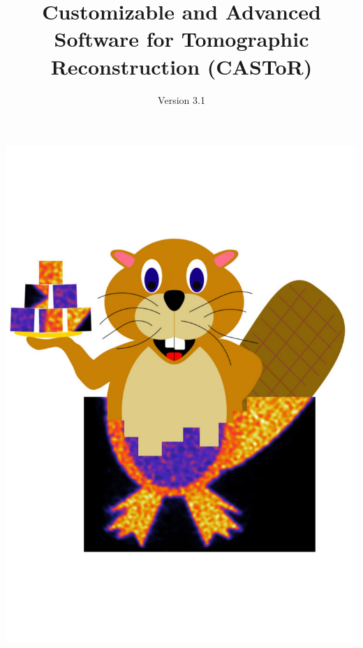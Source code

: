 \documentclass[a4paper, 11pt]{article}
\begin{document}
\title{Customizable and Advanced Software for Tomographic Reconstruction (CASToR)}
\author{Version 3.1}
\maketitle
\centerline{\includegraphics[scale=0.5]{figures/CASToR_logo.pdf}}
\newpage

\tableofcontents


\newpage
\end{document}
